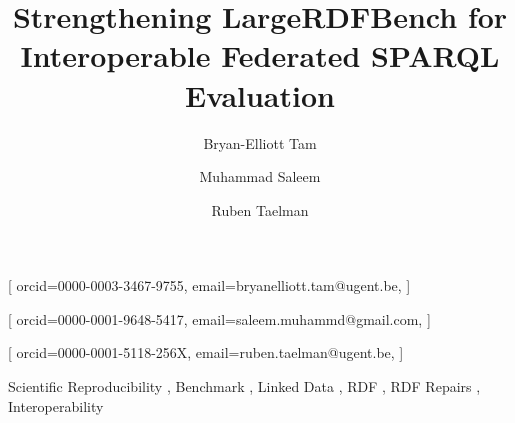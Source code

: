\documentclass[]{ceurart}
\newif\ifarxiv
\begin{document}

\ifarxiv
\conference{}
\else
{}
\fi

\title{Strengthening LargeRDFBench for Interoperable Federated SPARQL Evaluation}

\author[1]{Bryan-Elliott Tam}[%
	orcid=0000-0003-3467-9755,
	email=bryanelliott.tam@ugent.be,
]
\cormark[1]
\author[2]{Muhammad Saleem}[%
    orcid=0000-0001-9648-5417,
	email=saleem.muhammd@gmail.com,
]
\author[1]{Ruben Taelman}[%
	orcid=0000-0001-5118-256X,
	email=ruben.taelman@ugent.be,
]
\address[1]{Department of Electronics and Information Systems, Ghent University -- imec}
\address[2]{AKSW, University Leipzig, Germany}



\begin{keywords}
    Scientific Reproducibility \sep
    Benchmark \sep
	Linked Data \sep
	RDF \sep
	RDF Repairs \sep
	Interoperability
\end{keywords}

\maketitle










\end{document}
